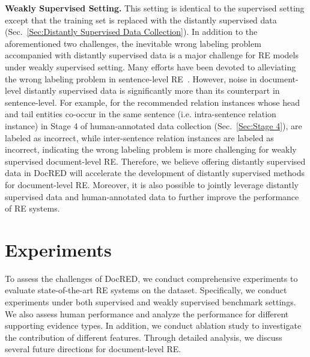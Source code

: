 \documentclass[11pt,a4paper]{article}
\begin{document}
\smallskip
\noindent
\textbf{Weakly Supervised Setting.}
This setting is identical to the supervised setting except that the training set is replaced with the distantly supervised data (Sec.~\ref{Sec:Distantly Supervised Data Collection}). In addition to the aforementioned two challenges, the inevitable wrong labeling problem accompanied with distantly supervised data is a major challenge for RE models under weakly supervised setting. Many efforts have been devoted to alleviating the wrong labeling problem in sentence-level RE~\cite{DBLP:conf/pkdd/RiedelYM10,hoffmann2011knowledge,surdeanu2012multi,lin2016neural}. However, noise in document-level distantly supervised data is significantly more than its counterpart in sentence-level. For example, for the recommended relation instances whose head and tail entities co-occur in the same sentence (i.e. intra-sentence relation instance) in Stage 4 of human-annotated data collection (Sec.~\ref{Sec:Stage 4}),  are labeled as incorrect, while  inter-sentence relation instances are labeled as incorrect, indicating the wrong labeling problem is more challenging for weakly supervised document-level RE.
Therefore, we believe offering distantly supervised data in DocRED will accelerate the development of distantly supervised methods for document-level RE. Moreover, it is also possible to jointly leverage distantly supervised data and human-annotated data to further improve the performance of RE systems. 






\section{Experiments}
To assess the challenges of DocRED, we conduct comprehensive experiments to evaluate state-of-the-art RE systems on the dataset. Specifically, we conduct experiments under both supervised and weakly supervised benchmark settings. We also assess human performance and analyze the performance for different supporting evidence types. In addition, we conduct ablation study to investigate the contribution of different features. Through detailed analysis, we discuss several future directions for document-level RE.
\end{document}
